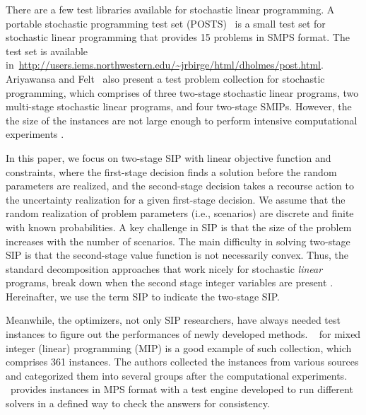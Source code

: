 There are a few test libraries available for stochastic linear programming. 
A portable stochastic programming test set (POSTS)~\cite{POSTS} is a small test set for 
stochastic linear programming that provides 15 problems in SMPS format. The test set is available in~\url{http://users.iems.northwestern.edu/~jrbirge/html/dholmes/post.html}.
Ariyawansa and Felt~\cite{journal:AF2004} also present a test problem collection for stochastic programming, which comprises of three two-stage stochastic linear programs, two multi-stage stochastic linear programs, and four two-stage SMIPs. However, the the size of the instances are not large enough to perform intensive computational experiments . 

In this paper, we focus on two-stage SIP with 
linear objective function and constraints, where the first-stage decision finds a solution before the 
random parameters are realized, and the second-stage decision takes a recourse action to the 
uncertainty realization for a given first-stage decision. We assume that the random realization of problem parameters (i.e., scenarios) are discrete and finite with known probabilities.
A key challenge in SIP is that the size of
the problem increases with the number of scenarios. The main difficulty in solving two-stage SIP is that the 
second-stage value function is not necessarily convex. Thus, the standard decomposition 
approaches that work nicely for stochastic \textit{linear} programs, break down when the 
second stage integer variables are present \cite{journal:AG2004}. Hereinafter, we use the 
term SIP to indicate the two-stage SIP. 


Meanwhile, the optimizers, not only SIP researchers, have always needed test instances to 
figure out the performances of newly developed methods. \miplib\ \cite{MIPLIB} for mixed 
integer (linear) programming (MIP) is a good example of such collection, which comprises 361 
instances. The authors collected the instances from various sources and categorized them into 
several groups after the computational experiments. \miplib\ provides instances in 
\textsf{MPS} format with a test engine developed to run different solvers in a defined way to 
check the answers for consistency. 


